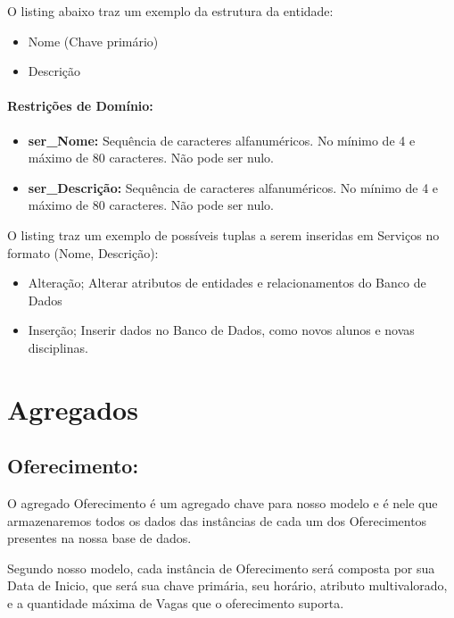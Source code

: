 \documentclass{report}
\begin{document}
  O listing abaixo traz um exemplo da estrutura da entidade:
\begin{itemize}
  \item Nome (Chave primário)
  \item Descrição
\end{itemize}
\paragraph{Restrições de Domínio:}
\begin{itemize}
  \item \textbf{ser\_Nome:} Sequência de caracteres alfanuméricos. No mínimo de 4 e máximo de 80 caracteres. Não pode ser nulo.
    \item \textbf{ser\_Descrição:} Sequência de caracteres alfanuméricos. No mínimo de 4 e máximo de 80 caracteres. Não pode ser nulo.
\end{itemize}
O listing traz um exemplo de possíveis tuplas a serem inseridas em Serviços no formato (Nome, Descrição):

\begin{itemize}
  \item Alteração; Alterar atributos de entidades e relacionamentos do Banco de Dados
  \item Inserção; Inserir dados no Banco de Dados, como novos alunos e novas disciplinas.
\end{itemize}
\section{Agregados}
\subsection{Oferecimento:}
 O agregado Oferecimento é um agregado chave para nosso modelo e é nele que armazenaremos todos os dados das instâncias de cada um dos Oferecimentos presentes na nossa base de dados.
  
  Segundo nosso modelo, cada instância de Oferecimento será composta por sua Data de Inicio, que será sua chave primária, seu horário, atributo multivalorado, e a quantidade máxima de Vagas que o oferecimento suporta.
      
\end{document}

